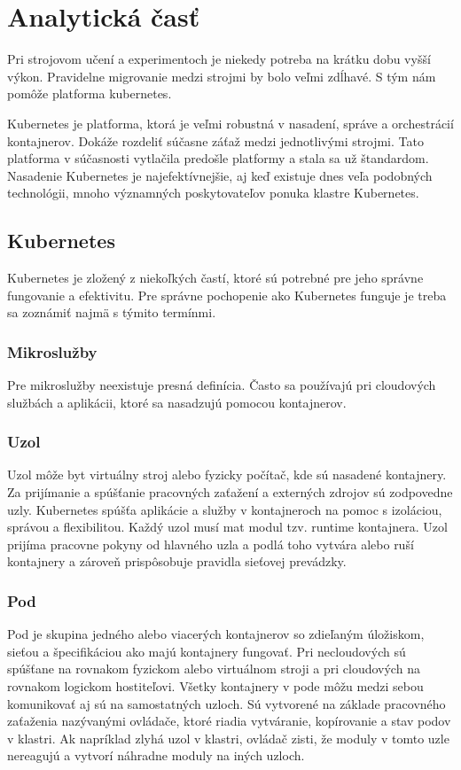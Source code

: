 
\chapter{Analytická časť}
Pri strojovom učení a experimentoch je niekedy potreba na krátku dobu vyšší výkon. Pravidelne migrovanie medzi strojmi by bolo veľmi zdĺhavé. S tým nám pomôže platforma kubernetes.

Kubernetes je platforma, ktorá je veľmi robustná v nasadení, správe a orchestrácií kontajnerov. Dokáže rozdeliť súčasne záťaž medzi jednotlivými strojmi. Tato platforma v súčasnosti vytlačila predošle platformy a stala sa už štandardom. Nasadenie Kubernetes je najefektívnejšie, aj keď existuje dnes veľa podobných technológii, mnoho významných poskytovateľov ponuka klastre Kubernetes.


\section{Kubernetes}
Kubernetes je zložený z niekoľkých častí, ktoré sú potrebné pre jeho správne fungovanie a efektivitu. Pre správne pochopenie ako Kubernetes funguje je treba sa zoznámiť najmä s týmito termínmi.

\subsection*{Mikroslužby}
Pre mikroslužby neexistuje presná definícia. Často sa používajú pri cloudových službách a aplikácii, ktoré sa nasadzujú pomocou kontajnerov.  

\subsection*{Uzol}
Uzol môže byt virtuálny stroj alebo fyzicky počítač, kde sú nasadené kontajnery. Za prijímanie a spúšťanie pracovných zaťažení a externých zdrojov sú zodpovedne uzly. Kubernetes spúšťa aplikácie a služby v kontajneroch na pomoc s izoláciou, správou a flexibilitou. Každý uzol musí mat modul tzv. runtime kontajnera. Uzol prijíma pracovne pokyny od hlavného uzla a podlá toho vytvára alebo ruší kontajnery a zároveň prispôsobuje pravidla sieťovej prevádzky.

\subsection*{Pod}
Pod je skupina jedného alebo viacerých kontajnerov so zdieľaným úložiskom, sieťou a špecifikáciou ako majú kontajnery fungovať. Pri necloudových sú spúšťane na rovnakom fyzickom alebo virtuálnom stroji a pri cloudových na rovnakom logickom hostiteľovi. Všetky kontajnery v pode môžu medzi sebou komunikovať aj sú na samostatných uzloch. Sú vytvorené na základe pracovného zaťaženia nazývanými ovládače, ktoré riadia vytváranie, kopírovanie a stav podov v klastri. Ak napríklad zlyhá uzol v klastri, ovládač zisti, že moduly v tomto uzle nereagujú a vytvorí náhradne moduly na iných uzloch.

